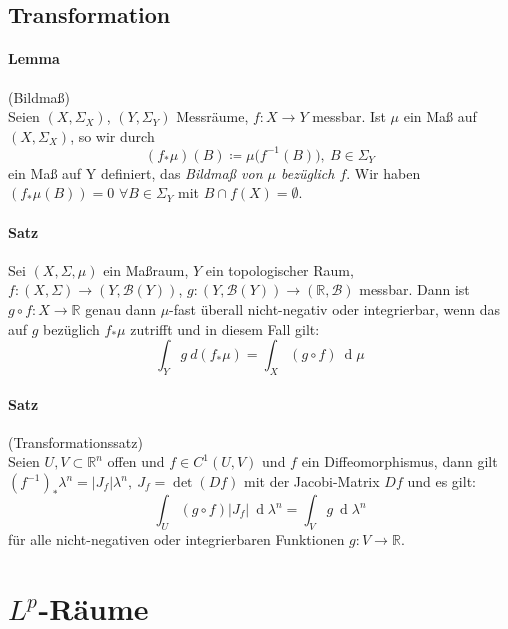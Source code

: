 \documentclass[12pt,a4paper,fleqn]{article}
\def\d{{\operatorname{d}}}
\begin{document}
\subsection{Transformation}
\paragraph{Lemma} (Bildmaß)\\
Seien $(X, \Sigma_X)$, $(Y, \Sigma_Y)$ Messräume, $f\colon X \rightarrow Y$ messbar. Ist $\mu$ ein Maß auf $(X, \Sigma_X)$, so wir durch 
\begin{displaymath}
(f_\ast\mu)(B) \coloneqq \mu\big(f^{-1}(B)\big),\ B \in \Sigma_Y
\end{displaymath}
ein Maß auf Y definiert, das \textit{Bildmaß von $\mu$ bezüglich $f$}. Wir haben \mbox{$(f_\ast\mu(B))= 0$} $\forall B \in \Sigma_Y$ mit $B \cap f(X) = \emptyset$.

\paragraph{Satz} Sei $(X, \Sigma, \mu)$ ein Maßraum, $Y$ ein topologischer Raum, \mbox{$f\colon (X, \Sigma) \rightarrow (Y, \mathcal{B}(Y))$}, $g\colon (Y, \mathcal{B}(Y)) \rightarrow (\mathbb{R}, \mathcal{B})$ messbar. Dann ist $g \circ f\colon X \rightarrow \mathbb{R}$ genau dann $\mu$-fast überall nicht-negativ oder integrierbar, wenn das auf $g$ bezüglich $f _\ast \mu$ zutrifft und in diesem Fall gilt:
\begin{displaymath}
\int_Y g\ d(f_\ast \mu) = \int_X (g \circ f)\ \d\mu 
\end{displaymath}

\paragraph{Satz} (Transformationssatz)\\
Seien $U, V \subset \mathbb{R}^n$ offen und $f \in C^1(U, V)$ und $f$ ein Diffeomorphismus, dann gilt $(f^{-1}) _\ast \lambda^n = \vert J_f \vert \lambda^n,\ J_f = \det(Df)$
 mit der Jacobi-Matrix $Df$ und es gilt:
\begin{displaymath}
\int_U (g \circ f)\vert J_f \vert\ \d\lambda^n = \int_V g\ \d\lambda^n
\end{displaymath}
für alle nicht-negativen oder integrierbaren Funktionen $g\colon V \rightarrow \mathbb{R}$.

\section{$L^p$-Räume}
\end{document}
